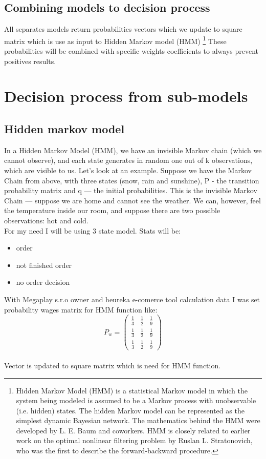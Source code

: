 \subsection{Combining models to decision process} \label{subsec:combining_models}
All separates models return probabilities vectors which we update to square matrix which is use as input to Hidden Markov model (HMM) \footnote{Hidden Markov Model (HMM) is a statistical Markov model
in which the system being modeled is assumed to be a Markov process with unobservable (i.e. hidden) states.
The hidden Markov model can be represented as the simplest dynamic Bayesian network.
The mathematics behind the HMM were developed by L. E. Baum and coworkers.
HMM is closely related to earlier work on the optimal nonlinear filtering problem by Ruslan L. Stratonovich,
who was the first to describe the forward-backward procedure.}
These probabilities will be combined with specific weights coefficients to always prevent positives results.
\section{Decision process from sub-models} \label{sec:decision}
\subsection{Hidden markov model} \label{subsec:hhm}
In a Hidden Markov Model (HMM), we have an invisible Markov chain (which we cannot observe), and each state
generates in random one out of k observations, which are visible to us. Let’s look at an example.
Suppose we have the Markov Chain from above, with three states (snow, rain and sunshine),
P - the transition probability matrix and q — the initial probabilities.
This is the invisible Markov Chain — suppose we are home and cannot see the weather.
We can, however, feel the temperature inside our room, and suppose there are two possible observations: hot and cold.\\
For my need I will be using 3 state model.
Stats will be:\\
\begin{itemize}
    \item order
    \item not finished order
    \item no order decision
\end{itemize}
With Megaplay s.r.o owner and heureka e-comerce tool calculation data I was set probability wages matrix for HMM function like:\\
\begin{equation*}
    P_w =
    \begin{pmatrix}
        \frac{1}{3} & \frac{1}{2} & \frac{1}{9} \\
        \frac{1}{3} & \frac{1}{2} & \frac{1}{9} \\
        \frac{1}{3} & \frac{1}{2} & \frac{1}{9}
    \end{pmatrix}
\end{equation*}\\
Vector is updated to square matrix which is need for HMM function.\\

